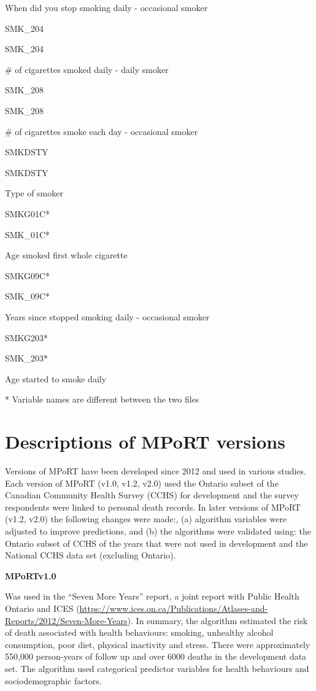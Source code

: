 \documentclass[]{book}
\begin{document}
When did you stop smoking daily - occasional smoker

SMK\_204

SMK\_204

\# of cigarettes smoked daily - daily smoker

SMK\_208

SMK\_208

\# of cigarettes smoke each day - occasional smoker

SMKDSTY

SMKDSTY

Type of smoker

SMKG01C*

SMK\_01C*

Age smoked first whole cigarette

SMKG09C*

SMK\_09C*

Years since stopped smoking daily - occasional smoker

SMKG203*

SMK\_203*

Age started to smoke daily

* Variable names are different between the two files

\section{Descriptions of MPoRT
versions}\label{descriptions-of-mport-versions}

Versions of MPoRT have been developed since 2012 and used in various
studies. Each version of MPoRT (v1.0, v1.2, v2.0) used the Ontario
subset of the Canadian Community Health Survey (CCHS) for development
and the survey respondents were linked to personal death records. In
later versions of MPoRT (v1.2, v2.0) the following changes were made:,
(a) algorithm variables were adjusted to improve predictions, and (b)
the algorithms were validated using: the Ontario subset of CCHS of the
years that were not used in development and the National CCHS data set
(excluding Ontario).

\textbf{MPoRTv1.0}

Was used in the ``Seven More Years'' report, a joint report with Public
Health Ontario and ICES
(\url{https://www.ices.on.ca/Publications/Atlases-and-Reports/2012/Seven-More-Years}).
In summary, the algorithm estimated the risk of death associated with
health behaviours: smoking, unhealthy alcohol consumption, poor diet,
physical inactivity and stress. There were approximately 550,000
person-years of follow up and over 6000 deaths in the development data
set. The algorithm used categorical predictor variables for health
behaviours and sociodemographic factors.
\end{document}
